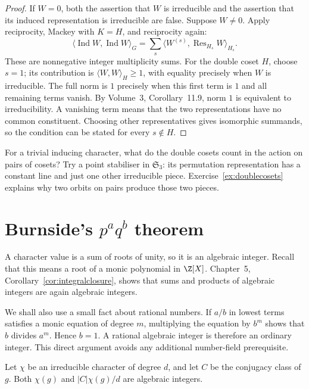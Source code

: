 \begin{proof}
If $W=0$, both the assertion that $W$ is irreducible and the assertion that its induced representation is irreducible are false. Suppose $W\ne0$. Apply reciprocity, Mackey with $K=H$, and reciprocity again:
\[
\langle\operatorname{Ind}W,\operatorname{Ind}W\rangle_G
=\sum_s\langle W^{(s)},\operatorname{Res}_{H_s}W\rangle_{H_s}.
\]
These are nonnegative integer multiplicity sums. For the double coset $H$, choose $s=1$; its contribution is $\langle W,W\rangle_H\ge1$, with equality precisely when $W$ is irreducible. The full norm is $1$ precisely when this first term is $1$ and all remaining terms vanish. By Volume~3, Corollary~11.9, norm $1$ is equivalent to irreducibility. A vanishing term means that the two representations have no common constituent. Choosing other representatives gives isomorphic summands, so the condition can be stated for every $s\notin H$.
\end{proof}

\begin{think}
For a trivial inducing character, what do the double cosets count in the action on pairs of cosets? Try a point stabiliser in $\mathfrak S_3$: its permutation representation has a constant line and just one other irreducible piece. Exercise~\ref{ex:doublecosets} explains why two orbits on pairs produce those two pieces.
\end{think}

\section{Burnside's \texorpdfstring{$p^aq^b$}{paqb} theorem}

A character value is a sum of roots of unity, so it is an algebraic integer. Recall that this means a root of a monic polynomial in $\Z[X]$. Chapter~5, Corollary~\ref{cor:integralclosure}, shows that sums and products of algebraic integers are again algebraic integers.

We shall also use a small fact about rational numbers. If $a/b$ in lowest terms satisfies a monic equation of degree $m$, multiplying the equation by $b^m$ shows that $b$ divides $a^m$. Hence $b=1$. A rational algebraic integer is therefore an ordinary integer. This direct argument avoids any additional number-field prerequisite.

\begin{lemma}\label{lem:omega}
Let $\chi$ be an irreducible character of degree $d$, and let $C$ be the conjugacy class of $g$. Both $\chi(g)$ and $|C|\chi(g)/d$ are algebraic integers.
\end{lemma}

